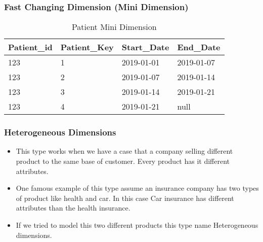 \begin{frame}
	\frametitle{Fast Changing Dimension (Mini Dimension)}

\begin{table}
	\begin{adjustbox}{max width=.7\textwidth}
		\begin{tabular}{| l | l | l | l |}
			\hline
			Patient\_id & Patient\_Key & Start\_Date & End\_Date\\
			\hline
			\hline		
			123 & 1   & 2019-01-01 & 2019-01-07\\
			123 & 2   & 2019-01-07 & 2019-01-14\\
			123 & 3   & 2019-01-14 & 2019-01-21\\
			123 & 4   & 2019-01-21 & null\\
			\hline
		\end{tabular}
	\end{adjustbox}
	\caption{Patient Mini Dimension}
\end{table}

\end{frame}
\VideoClassification[column=1, colour=blue]
\begin{frame}
\frametitle{Heterogeneous Dimensions}
\begin{itemize}[<+->]
	
	\item This type works when we have a case that a company selling different product to the same base of customer. Every product has it different attributes. 
	\item One famous example of this type assume an insurance company has two types of product like health and car. In this case Car insurance has different attributes than the health insurance.
	\item If we tried to model this two different products this type name Heterogeneous dimensions. 
\end{itemize}
\end{frame}
